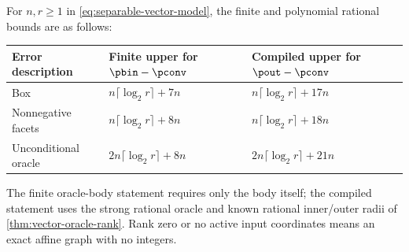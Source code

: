 \begin{theorem}\label{thm:separable-vector-rank}
For $n,r\ge1$ in \eqref{eq:separable-vector-model}, the finite and
polynomial rational bounds are as follows:
\begin{center}
\begin{tabular}{lll}
\toprule
Error description & Finite upper for $\pbin-\pconv$ & Compiled upper for $\pout-\pconv$\\
\midrule
Box & $n\lceil\log_2r\rceil+7n$ & $n\lceil\log_2r\rceil+17n$\\
Nonnegative facets & $n\lceil\log_2r\rceil+8n$ & $n\lceil\log_2r\rceil+18n$\\
Unconditional oracle & $2n\lceil\log_2r\rceil+8n$ & $2n\lceil\log_2r\rceil+21n$\\
\bottomrule
\end{tabular}
\end{center}
The finite oracle-body statement requires only the body itself; the
compiled statement uses the strong rational oracle and known rational
inner/outer radii of \cref{thm:vector-oracle-rank}. Rank zero or no
active input coordinates means an exact affine graph with no integers.
\end{theorem}
